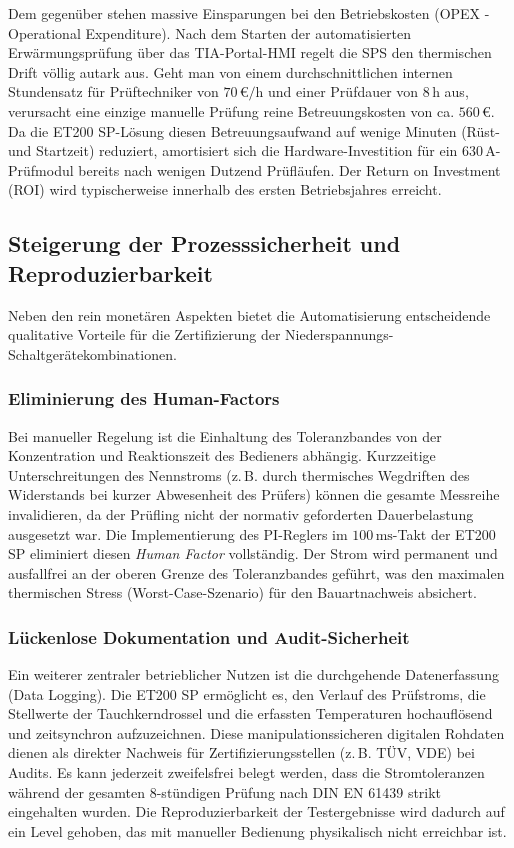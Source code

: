 Dem gegenüber stehen massive Einsparungen bei den Betriebskosten (OPEX - Operational Expenditure). Nach dem Starten der automatisierten Erwärmungsprüfung über das TIA-Portal-HMI regelt die SPS den thermischen Drift völlig autark aus. 
Geht man von einem durchschnittlichen internen Stundensatz für Prüftechniker von $70\,\text{€/h}$ und einer Prüfdauer von $8\,\text{h}$ aus, verursacht eine einzige manuelle Prüfung reine Betreuungskosten von ca. $560\,\text{€}$. Da die ET200 SP-Lösung diesen Betreuungsaufwand auf wenige Minuten (Rüst- und Startzeit) reduziert, amortisiert sich die Hardware-Investition für ein 630\,A-Prüfmodul bereits nach wenigen Dutzend Prüfläufen. Der Return on Investment (ROI) wird typischerweise innerhalb des ersten Betriebsjahres erreicht.

\subsection{Steigerung der Prozesssicherheit und Reproduzierbarkeit}
\label{sec:prozesssicherheit}

Neben den rein monetären Aspekten bietet die Automatisierung entscheidende qualitative Vorteile für die Zertifizierung der Niederspannungs-Schaltgerätekombinationen.

\subsubsection{Eliminierung des Human-Factors}
Bei manueller Regelung ist die Einhaltung des Toleranzbandes von der Konzentration und Reaktionszeit des Bedieners abhängig. Kurzzeitige Unterschreitungen des Nennstroms (z.\,B. durch thermisches Wegdriften des Widerstands bei kurzer Abwesenheit des Prüfers) können die gesamte Messreihe invalidieren, da der Prüfling nicht der normativ geforderten Dauerbelastung ausgesetzt war. Die Implementierung des PI-Reglers im $100\,\text{ms}$-Takt der ET200 SP eliminiert diesen \textit{Human Factor} vollständig. Der Strom wird permanent und ausfallfrei an der oberen Grenze des Toleranzbandes geführt, was den maximalen thermischen Stress (Worst-Case-Szenario) für den Bauartnachweis absichert.

\subsubsection{Lückenlose Dokumentation und Audit-Sicherheit}
Ein weiterer zentraler betrieblicher Nutzen ist die durchgehende Datenerfassung (Data Logging). Die ET200 SP ermöglicht es, den Verlauf des Prüfstroms, die Stellwerte der Tauchkerndrossel und die erfassten Temperaturen hochauflösend und zeitsynchron aufzuzeichnen. Diese manipulationssicheren digitalen Rohdaten dienen als direkter Nachweis für Zertifizierungsstellen (z.\,B. TÜV, VDE) bei Audits. Es kann jederzeit zweifelsfrei belegt werden, dass die Stromtoleranzen während der gesamten $8$-stündigen Prüfung nach DIN EN 61439 strikt eingehalten wurden. Die Reproduzierbarkeit der Testergebnisse wird dadurch auf ein Level gehoben, das mit manueller Bedienung physikalisch nicht erreichbar ist.